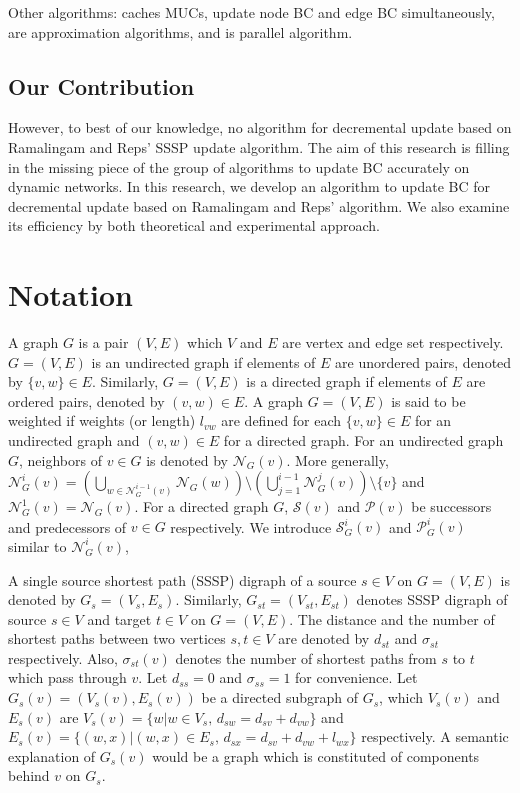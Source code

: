 \documentclass{article}
\begin{document}
Other algorithms: caches MUCs\cite{Singh2015}, update node BC and edge BC simultaneously\cite{Kourtellis2015}, are approximation algorithms\cite{Hayashi2015,Bergamini2015a,Bergamini2015b,Chernoskutov2015}, and is parallel algorithm\cite{Jamour2017}.

\subsection*{Our Contribution}
However, to best of our knowledge, no algorithm for decremental update based on Ramalingam and Reps' SSSP update algorithm.
The aim of this research is filling in the missing piece of the group of algorithms to update BC accurately on dynamic networks.
In this research, we develop an algorithm to update BC for decremental update based on Ramalingam and Reps' algorithm.
We also examine its efficiency by both theoretical and experimental approach.

\section{Notation}
A graph $G$ is a pair $(V,E)$ which $V$ and $E$ are vertex and edge set respectively.
$G=(V,E)$ is an undirected graph if elements of $E$ are unordered pairs, denoted by $\{v,w\}\in E$.
Similarly, $G=(V,E)$ is a directed graph if elements of $E$ are ordered pairs, denoted by $(v,w)\in E$.
A graph $G=(V,E)$ is said to be weighted if weights (or length) $l_{vw}$ are defined for each $\{v,w\}\in E$ for an undirected graph and $(v,w)\in E$ for a directed graph.
For an undirected graph $G$, neighbors of $v\in G$ is denoted by $\mathcal{N}_G(v)$.
More generally, $\mathcal{N}_G^i(v)=\left(\bigcup_{w\in\mathcal{N}_G^{i-1}(v)}\mathcal{N}_G(w)\right)\setminus\left(\bigcup_{j=1}^{i-1}\mathcal{N}_G^j(v)\right)\setminus\{v\}$ and $\mathcal{N}_G^1(v)=\mathcal{N}_G(v)$.
For a directed graph $G$, $\mathcal{S}(v)$ and $\mathcal{P}(v)$ be successors and predecessors of $v\in G$ respectively.
We introduce $\mathcal{S}_G^i(v)$ and $\mathcal{P}_G^i(v)$ similar to $\mathcal{N}_G^i(v)$, 

A single source shortest path (SSSP) digraph of a source $s\in V$ on $G=(V,E)$ is denoted by $G_s=(V_s,E_s)$.
Similarly, $G_{st}=(V_{st},E_{st})$ denotes SSSP digraph of source $s\in V$ and target $t\in V$ on $G=(V,E)$.
The distance and the number of shortest paths between two vertices $s,t\in V$ are denoted by $d_{st}$ and $\sigma_{st}$ respectively.
Also, $\sigma_{st}(v)$ denotes the number of shortest paths from $s$ to $t$ which pass through $v$.
Let $d_{ss}=0$ and $\sigma_{ss}=1$ for convenience.
Let $G_{s}(v)=\left(V_s(v),E_s(v)\right)$ be a directed subgraph of $G_s$, which  $V_s(v)$ and $E_s(v)$ are $V_s(v)=\{w|w\in V_s,\,d_{sw}=d_{sv}+d_{vw}\}$ and $E_s(v)=\{(w,x)|(w,x)\in E_s,\,d_{sx}=d_{sv}+d_{vw}+l_{wx}\}$ respectively.
A semantic explanation of $G_s(v)$ would be a graph which is constituted of components behind $v$ on $G_s$.
\end{document}
